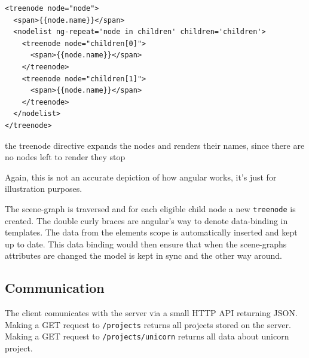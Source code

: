 \begin{listing}[H]
  \begin{verbatim}
<treenode node="node">
  <span>{{node.name}}</span>
  <nodelist ng-repeat='node in children' children='children'>
    <treenode node="children[0]">
      <span>{{node.name}}</span>
    </treenode>
    <treenode node="children[1]">
      <span>{{node.name}}</span>
    </treenode>
  </nodelist>
</treenode>
  \end{verbatim}
  \caption{the treenode directive expands the nodes and renders their names, since there are no nodes left to render they stop}
\end{listing}


Again, this is not an accurate depiction of how angular works, it's just
for illustration purposes.

The scene-graph is traversed and for each eligible child node a new
\texttt{treenode} is created. The double curly braces are angular's way
to denote data-binding in templates. The data from the elements scope is
automatically inserted and kept up to date. This data binding would then
ensure that when the scene-graphs attributes are changed the model is
kept in sync and the other way around.

\subsection{Communication}
\label{interaction}

The client comunicates with the server via a small HTTP API returning JSON.
Making a GET request to \texttt{/projects} returns all projects stored on the server.
Making a GET request to \texttt{/projects/unicorn} returns all data about unicorn project.
